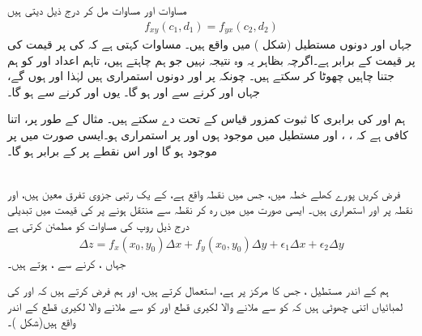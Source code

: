 مساوات  اور مساوات  مل کر درج ذیل دیتی  ہیں
\begin{align}\label{مساوات_ضمیمہ_یولر_د} 
f_{xy}(c_1,d_1)=f_{yx}(c_2,d_2)
\end{align}
جہاں  اور  دونوں مستطیل    (شکل ) میں  واقع  ہیں۔ مساوات    کہتی ہے کہ  کی  پر قیمت  کی  پر قیمت کے برابر ہے۔اگرچہ  بظاہر یہ وہ نتیجہ نہیں جو ہم چاہتے ہیں،   تاہم اعداد  اور  کو ہم جتنا چاہیں چھوٹا کر  سکتے ہیں۔ چونکہ     پر  اور   دونوں استمراری ہیں  لہٰذا   اور 
 ہوں گے،  جہاں  اور  کرنے سے  اور  ہو گا۔ یوں  اور  کرنے سے   ہو گا۔

ہم  اور  کی برابری   کا ثبوت کمزور قیاس     کے تحت دے سکتے ہیں۔  مثال کے طور پر، اتنا کافی ہے کہ ، ، اور   مستطیل   میں موجود ہوں اور  پر  استمراری ہو۔ایسی صورت میں  پر  موجود ہو گا اور اس نقطے پر  کے برابر ہو گا۔

\\
فرض کریں پورے  کھلے خطہ  میں، جس میں نقطہ   واقع ہے،  کے یک رتبی جزوی تفرق معین ہیں، اور نقطہ  پر  اور  استمراری ہیں۔ ایسی صورت میں  میں رہ کر نقطہ
  سے  منتقل ہونے پر  کی قیمت میں تبدیلی   درج ذیل روپ کی مساوات کو  مطمئن کرتی ہے
\begin{align*}
\Delta z=f_x(x_0,y_0)\Delta x+f_y(x_0,y_0)\Delta y+\epsilon_1\Delta x+\epsilon_2\Delta y
\end{align*}
جہاں ،  کرنے سے ،   ہوتے ہیں۔

ہم  کے   اندر مستطیل  ، جس کا مرکز   پر ہے،   استعمال کرتے ہیں، اور ہم فرض کرتے ہیں کہ  اور  کی لمبائیاں اتنی چھوٹی ہیں کہ  کو  سے ملانے والا لکیری قطع اور  کو 
 سے ملانے والا لکیری قطع  کے اندر  واقع  ہیں(شکل )۔

